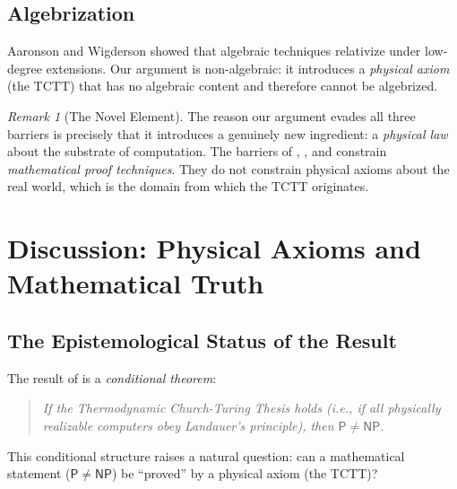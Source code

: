 \documentclass[12pt, a4paper]{article}
\theoremstyle{plain}
\theoremstyle{definition}
\theoremstyle{remark}
\newtheorem{remark}[theorem]{Remark}
\newcommand{\Pc}{\mathsf{P}}
\newcommand{\NPc}{\mathsf{NP}}
\begin{document}
\subsection{Algebrization}

Aaronson and Wigderson \citep{AaronsonWigderson2009} showed that
algebraic techniques relativize under low-degree extensions. Our
argument is non-algebraic: it introduces a \emph{physical axiom}
(the TCTT) that has no algebraic content and therefore cannot be
algebrized.

\begin{remark}[The Novel Element]
  The reason our argument evades all three barriers is precisely
  that it introduces a genuinely new ingredient: a \emph{physical law}
  about the substrate of computation. The barriers of
  \citet{BakerGillSolovay1975}, \citet{RazborovRudich1997}, and
  \citet{AaronsonWigderson2009} constrain \emph{mathematical proof
  techniques}. They do not constrain physical axioms about the
  real world, which is the domain from which the TCTT originates.
\end{remark}

\section{Discussion: Physical Axioms and Mathematical Truth}\label{sec:discussion}

\subsection{The Epistemological Status of the Result}

The result of  is a \emph{conditional theorem}:
\begin{quote}
  \emph{If the Thermodynamic Church-Turing Thesis holds (i.e., if all
  physically realizable computers obey Landauer's principle), then
  $\Pc \neq \NPc$.}
\end{quote}

This conditional structure raises a natural question: can a mathematical
statement ($\Pc \neq \NPc$) be ``proved'' by a physical axiom (the TCTT)?
\end{document}
